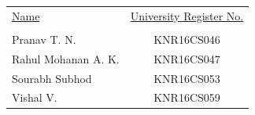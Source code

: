 \begin{table}[!h]
\centering
\begin{tabular}{lc}
\underline{Name} & \underline{University Register No.} \\
\\
Pranav T. N. & KNR16CS046 \\
Rahul Mohanan A. K. & KNR16CS047 \\
Sourabh Subhod & KNR16CS053 \\
Vishal V. & KNR16CS059 \\
\end{tabular}
\end{table}

  
\vspace*{2.6cm}
\hspace*{-.5in}
\parbox{2.1in}{
 \\
}
 \parbox{2.1in}{
  \\
 }
\parbox{2.1in}{
\noindent  \\[0.18cm] 
 \\
\\
}
\vspace*{1cm}
\parskip 8pt
\clearpage  
  

